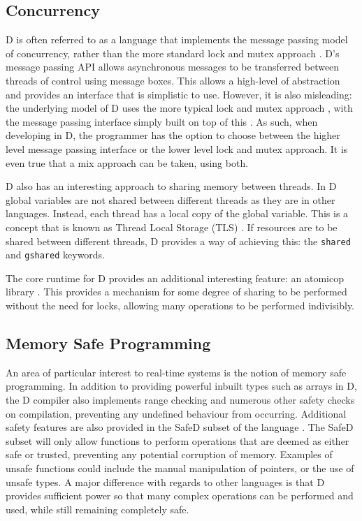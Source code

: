 \subsection{Concurrency}
D is often referred to as a language that implements the message passing model 
of concurrency, rather than the more standard lock and mutex approach 
\cite{ddili-book}. D's message passing API 
allows asynchronous messages to be transferred between threads of control using 
message boxes. This allows a high-level of abstraction and provides an 
interface that is simplistic to use. However, it is also misleading: the underlying 
model of D uses the more typical lock and mutex approach 
\cite{dlang-github-mutex}, 
with the message passing interface simply built on top of this 
\cite{dlang-github-concurrency}. 
As such, when developing in D, the programmer has the option to choose between 
the higher level message passing interface or the lower level lock and mutex 
approach. It is even true that a mix approach can be taken, using both.
\par\bigskip\noindent
D also has an interesting approach to sharing memory between threads. In D 
global variables are not shared between different threads as they are in 
other languages. Instead, each thread has a local copy of the global variable. 
This is a concept that is known as Thread Local Storage (TLS) 
\cite{migrate-to-shared}. 
If resources are to be shared between different threads, D provides a way of 
achieving this: the \texttt{shared} and
\texttt{\textunderscore{}\textunderscore{}gshared} keywords.
\par\bigskip\noindent
The core runtime for D provides an additional interesting feature: an atomicop 
library 
\cite{core-atomic}. 
This provides a mechanism for some degree of sharing to be performed without the 
need for locks, allowing many operations to be performed indivisibly.

\subsection{Memory Safe Programming}
An area of particular interest to real-time systems is the notion of memory 
safe programming. In addition to providing powerful inbuilt types such as arrays 
in D, the D compiler also implements range checking and numerous other 
safety checks on compilation, preventing any undefined behaviour from occurring.
Additional safety features are also provided in the SafeD subset of the language
\cite{safe-d}. The SafeD subset will only allow functions to perform 
operations that are deemed as either safe or trusted, preventing any 
potential corruption of memory. Examples of unsafe functions could include the 
manual manipulation of pointers, or the use of unsafe types. A major difference 
with regards to other languages is that D provides sufficient power so that many complex 
operations can be performed and used, while still remaining completely safe.

